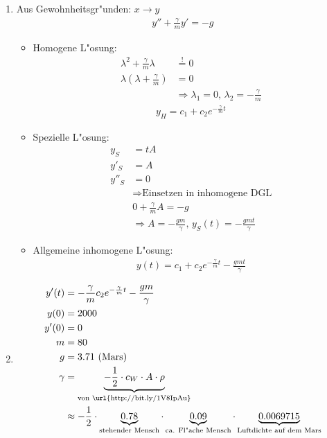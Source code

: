 \documentclass[fleqn,12pt]{scrartcl}
\begin{document}
\begin{enumerate}
	\item
		Aus Gewohnheitsgr"unden: $x\rightarrow y $
		\begin{align*}
			y'' + \frac{\gamma}m y' = -g
		\end{align*}
		\begin{itemize}
			\item
				Homogene L"osung:
				\begin{align*}
					\lambda^2 + \frac{\gamma}m\lambda &\overset!= 0\\
					\lambda(\lambda+\frac{\gamma}m) &= 0\\
					&\Rightarrow \lambda_1 = 0,\, \lambda_2 = -\frac{\gamma}m
				\end{align*}
				\begin{align*}
					y_H = c_1 + c_2e^{-\frac{\gamma}m t}
				\end{align*}
			\item
				Spezielle L"osung:
				\begin{align*}
					y_{S} &= tA\\
					y'_S &= A\\
					y''_S &= 0\\
								&\Rightarrow \text{Einsetzen in inhomogene DGL}\\
						 &0 + \frac{\gamma}mA = -g\\
						 &\Rightarrow A = -\frac{gm}\gamma,\, y_S(t) = -\frac{gmt}\gamma  
				\end{align*}
			\item
				Allgemeine inhomogene L"osung:
				\begin{align*}
					y(t) = c_1 + c_2e^{-\frac\gamma{m}t} -\frac{gmt}\gamma
				\end{align*}
		\end{itemize}
	\item
		\begin{align*}
			y'(t) &= -\frac{\gamma}mc_2e^{-\frac\gamma{m}t} - \frac{gm}\gamma\\
			y(0) &= 2000\\
			y'(0) &= 0\\
			m &= 80\\
			g &= 3.71 \text{  (Mars)}\\
			\gamma &= \underbrace{-\frac12 \cdot c_W \cdot A \cdot \rho}_{\text{von \url{http://bit.ly/1V8IpAu}}} \\
			&\approx -\frac12 \cdot \underbrace{0.78}_{\text{stehender Mensch}} \cdot \underbrace{0.09}_{\text{ca. Fl"ache Mensch}} 
									 \cdot \underbrace{0.0069715}_{\text{Luftdichte auf dem Mars}} \\

\end{align*}
\end{enumerate}
\end{document}
